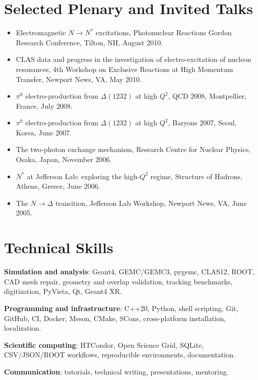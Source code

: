 \documentclass[11pt,letterpaper]{article}
\begin{document}
\newpage

\section*{Selected Plenary and Invited Talks}
\begin{itemize}
  \item Electromagnetic $N \to N^\ast$ excitations, Photonuclear Reactions Gordon Research Conference, Tilton, NH, August 2010.
  \item CLAS data and progress in the investigation of electro-excitation of nucleon resonances, 4th Workshop on Exclusive Reactions at High Momentum Transfer, Newport News, VA, May 2010.
  \item $\pi^0$ electro-production from $\Delta(1232)$ at high $Q^2$, QCD 2008, Montpellier, France, July 2008.
  \item $\pi^0$ electro-production from $\Delta(1232)$ at high $Q^2$, Baryons 2007, Seoul, Korea, June 2007.
  \item The two-photon exchange mechanism, Research Centre for Nuclear Physics, Osaka, Japan, November 2006.
  \item $N^\ast$ at Jefferson Lab: exploring the high-$Q^2$ regime, Structure of Hadrons, Athens, Greece, June 2006.
  \item The $N \to \Delta$ transition, Jefferson Lab Workshop, Newport News, VA, June 2005.
\end{itemize}

\section*{Technical Skills}
\textbf{Simulation and analysis}: Geant4, GEMC/GEMC3, pygemc, CLAS12, ROOT, CAD mesh repair,
geometry and overlap validation, tracking benchmarks, digitization, PyVista, Qt, Geant4 XR.

\textbf{Programming and infrastructure}: C++20, Python, shell scripting, Git, GitHub, CI, Docker,
Meson, CMake, SCons, cross-platform installation, localization.

\textbf{Scientific computing}: HTCondor, Open Science Grid, SQLite, CSV/JSON/ROOT workflows, reproducible environments, documentation.

\textbf{Communication}: tutorials, technical writing, presentations, mentoring.
\end{document}
